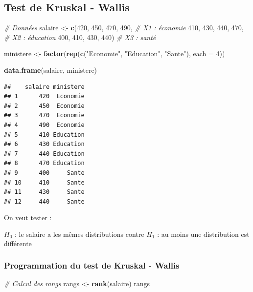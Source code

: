 \documentclass[
  12pt,
]{article}
\newenvironment{Shaded}{\begin{snugshade}}{\end{snugshade}}
\newcommand{\AttributeTok}[1]{\textcolor[rgb]{0.13,0.29,0.53}{#1}}
\newcommand{\CommentTok}[1]{\textcolor[rgb]{0.56,0.35,0.01}{\textit{#1}}}
\newcommand{\DecValTok}[1]{\textcolor[rgb]{0.00,0.00,0.81}{#1}}
\newcommand{\FunctionTok}[1]{\textcolor[rgb]{0.13,0.29,0.53}{\textbf{#1}}}
\newcommand{\NormalTok}[1]{#1}
\newcommand{\OtherTok}[1]{\textcolor[rgb]{0.56,0.35,0.01}{#1}}
\newcommand{\StringTok}[1]{\textcolor[rgb]{0.31,0.60,0.02}{#1}}
\begin{document}
\subsection{Test de Kruskal - Wallis}\label{test-de-kruskal---wallis}

\begin{Shaded}
\begin{Highlighting}[]
\CommentTok{\# Données}
\NormalTok{salaire }\OtherTok{\textless{}{-}} \FunctionTok{c}\NormalTok{(}\DecValTok{420}\NormalTok{, }\DecValTok{450}\NormalTok{, }\DecValTok{470}\NormalTok{, }\DecValTok{490}\NormalTok{,   }\CommentTok{\# X1 : économie}
             \DecValTok{410}\NormalTok{, }\DecValTok{430}\NormalTok{, }\DecValTok{440}\NormalTok{, }\DecValTok{470}\NormalTok{,   }\CommentTok{\# X2 : éducation}
             \DecValTok{400}\NormalTok{, }\DecValTok{410}\NormalTok{, }\DecValTok{430}\NormalTok{, }\DecValTok{440}\NormalTok{)   }\CommentTok{\# X3 : santé}

\NormalTok{ministere }\OtherTok{\textless{}{-}} \FunctionTok{factor}\NormalTok{(}\FunctionTok{rep}\NormalTok{(}\FunctionTok{c}\NormalTok{(}\StringTok{"Economie"}\NormalTok{, }\StringTok{"Education"}\NormalTok{, }\StringTok{"Sante"}\NormalTok{), }\AttributeTok{each =} \DecValTok{4}\NormalTok{))}

\FunctionTok{data.frame}\NormalTok{(salaire, ministere)}
\end{Highlighting}
\end{Shaded}

\begin{verbatim}
##    salaire ministere
## 1      420  Economie
## 2      450  Economie
## 3      470  Economie
## 4      490  Economie
## 5      410 Education
## 6      430 Education
## 7      440 Education
## 8      470 Education
## 9      400     Sante
## 10     410     Sante
## 11     430     Sante
## 12     440     Sante
\end{verbatim}

On veut tester :

\(H_0\) : le salaire a les mêmes distributions contre \(H_1\) : au moins
une distribution est différente

\subsubsection{Programmation du test de Kruskal -
Wallis}\label{programmation-du-test-de-kruskal---wallis}

\begin{Shaded}
\begin{Highlighting}[]
\CommentTok{\# Calcul des rangs}
\NormalTok{rangs }\OtherTok{\textless{}{-}} \FunctionTok{rank}\NormalTok{(salaire) }
\NormalTok{rangs}
\end{Highlighting}
\end{Shaded}
\end{document}
